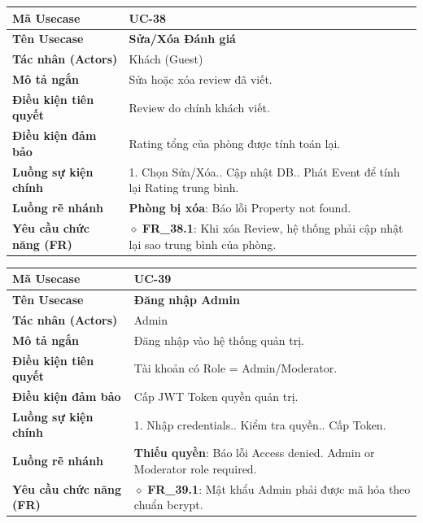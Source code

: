 \begin{table}[H]
\renewcommand{\arraystretch}{1.3}
\centering
\begin{tabularx}{\textwidth}{|p{4.5cm}|X|}
\hline
\cellcolor{gray!15}\bfseries Mã Usecase & \textbf{UC-38} \\ \hline
\cellcolor{gray!15}\bfseries Tên Usecase & \textbf{Sửa/Xóa Đánh giá} \\ \hline
\cellcolor{gray!15}\bfseries Tác nhân (Actors) & Khách (Guest) \\ \hline
\cellcolor{gray!15}\bfseries Mô tả ngắn & Sửa hoặc xóa review đã viết. \\ \hline
\cellcolor{gray!15}\bfseries Điều kiện tiên quyết & Review do chính khách viết. \\ \hline
\cellcolor{gray!15}\bfseries Điều kiện đảm bảo & Rating tổng của phòng được tính toán lại. \\ \hline
\cellcolor{gray!15}\bfseries Luồng sự kiện chính & 1. Chọn Sửa/Xóa.\newline 2. Cập nhật DB.\newline 3. Phát Event để tính lại Rating trung bình. \\ \hline
\cellcolor{gray!15}\bfseries Luồng rẽ nhánh & \textbf{Phòng bị xóa}: Báo lỗi Property not found. \\ \hline
\cellcolor{gray!15}\bfseries Yêu cầu chức năng (FR) & $\diamond$ \textbf{FR\_38.1}: Khi xóa Review, hệ thống phải cập nhật lại sao trung bình của phòng. \\ \hline
\end{tabularx}
\end{table}

\begin{table}[H]
\renewcommand{\arraystretch}{1.3}
\centering
\begin{tabularx}{\textwidth}{|p{4.5cm}|X|}
\hline
\cellcolor{gray!15}\bfseries Mã Usecase & \textbf{UC-39} \\ \hline
\cellcolor{gray!15}\bfseries Tên Usecase & \textbf{Đăng nhập Admin} \\ \hline
\cellcolor{gray!15}\bfseries Tác nhân (Actors) & Admin \\ \hline
\cellcolor{gray!15}\bfseries Mô tả ngắn & Đăng nhập vào hệ thống quản trị. \\ \hline
\cellcolor{gray!15}\bfseries Điều kiện tiên quyết & Tài khoản có Role = Admin/Moderator. \\ \hline
\cellcolor{gray!15}\bfseries Điều kiện đảm bảo & Cấp JWT Token quyền quản trị. \\ \hline
\cellcolor{gray!15}\bfseries Luồng sự kiện chính & 1. Nhập credentials.\newline 2. Kiểm tra quyền.\newline 3. Cấp Token. \\ \hline
\cellcolor{gray!15}\bfseries Luồng rẽ nhánh & \textbf{Thiếu quyền}: Báo lỗi Access denied. Admin or Moderator role required. \\ \hline
\cellcolor{gray!15}\bfseries Yêu cầu chức năng (FR) & $\diamond$ \textbf{FR\_39.1}: Mật khẩu Admin phải được mã hóa theo chuẩn bcrypt. \\ \hline
\end{tabularx}
\end{table}

